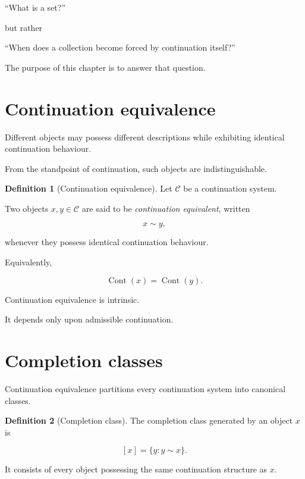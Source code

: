 \documentclass[13pt,openany]{book}
\theoremstyle{plain}
\theoremstyle{definition}
\newtheorem{definition}{Definition}[chapter]
\begin{document}
\begin{center}
``What is a set?''
\end{center}

but rather

\begin{center}
``When does a collection become forced by continuation itself?''
\end{center}

The purpose of this chapter is to answer that question.


\section{Continuation equivalence}

Different objects may possess different descriptions while exhibiting
identical continuation behaviour.

From the standpoint of continuation, such objects are indistinguishable.

\begin{definition}[Continuation equivalence]
Let $\mathcal C$ be a continuation system.

Two objects $x,y\in\mathcal C$ are said to be
\emph{continuation equivalent}, written

\[
x\sim y,
\]

whenever they possess identical continuation behaviour.

Equivalently,

\[
\operatorname{Cont}(x)
=
\operatorname{Cont}(y).
\]
\end{definition}

Continuation equivalence is intrinsic.

It depends only upon admissible continuation.


\section{Completion classes}

Continuation equivalence partitions every continuation system into canonical
classes.

\begin{definition}[Completion class]
The completion class generated by an object $x$ is

\[
[x]
=
\{y:y\sim x\}.
\]

It consists of every object possessing the same continuation structure as
$x$.
\end{definition}
\end{document}
